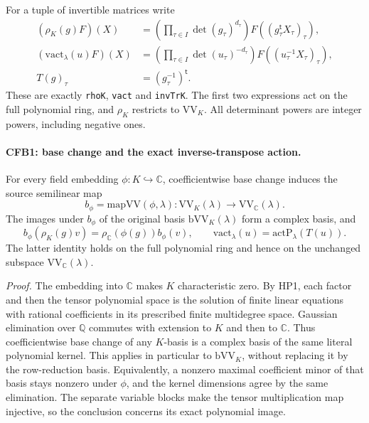 For a tuple of invertible matrices write
\[
 \begin{split}
 (\rho_K(g)F)(X)&=
       \left(\prod_{\tau\in I}\det(g_\tau)^{d_\tau}\right)
             F((g_\tau^{\mathsf t}X_\tau)_\tau),\\
 (\mathrm{vact}_\lambda(u)F)(X)&=
       \left(\prod_{\tau\in I}\det(u_\tau)^{-d_\tau}\right)
             F((u_\tau^{-1}X_\tau)_\tau),\\
 T(g)_\tau&=(g_\tau^{-1})^{\mathsf t}.
 \end{split}                                                    \tag{CFB.1}
\]
These are exactly \texttt{rhoK}, \texttt{vact} and
\texttt{invTrK}.  The first two expressions act on the full polynomial
ring, and \(\rho_K\) restricts to \(\mathrm{VV}_K\).
All determinant powers are integer powers, including negative ones.

\paragraph{CFB1: base change and the exact inverse-transpose action.}
\label{claim:CFB1}
For every field embedding \(\phi:K\hookrightarrow\mathbb C\),
coefficientwise base change induces the source semilinear map
\[
 b_\phi=\mathrm{mapVV}(\phi,\lambda):
        \mathrm{VV}_K(\lambda)\longrightarrow
        \mathrm{VV}_{\mathbb C}(\lambda).
                                                               \tag{CFB.2}
\]
The images under \(b_\phi\) of the original basis
\(\mathrm{bVV}_K(\lambda)\) form a complex basis, and
\[
 b_\phi(\rho_K(g)v)=\rho_{\mathbb C}(\phi(g))b_\phi(v),
 \qquad
 \mathrm{vact}_\lambda(u)=\mathrm{actP}_\lambda(T(u)).
                                                               \tag{CFB.3}
\]
The latter identity holds on the full polynomial ring and hence on
the unchanged subspace \(\mathrm{VV}_{\mathbb C}(\lambda)\).

\emph{Proof.}
The embedding into \(\mathbb C\) makes \(K\) characteristic zero.
By HP1, each factor and then the tensor polynomial space is the
solution of finite linear equations with rational coefficients in
its prescribed finite multidegree space.  Gaussian elimination over
\(\mathbb Q\) commutes with extension to \(K\) and then to
\(\mathbb C\).  Thus coefficientwise base change of any \(K\)-basis
is a complex basis of the same literal polynomial kernel.
This applies in particular to \(\mathrm{bVV}_K\), without replacing
it by the row-reduction basis.  Equivalently, a nonzero maximal
coefficient minor of that basis stays nonzero under \(\phi\), and
the kernel dimensions agree by the same elimination.  The separate
variable blocks make the tensor multiplication map injective, so
the conclusion concerns its exact polynomial image.

